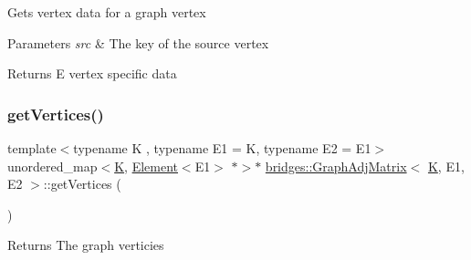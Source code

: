 \begin{DoxyVerb}Gets vertex data for a graph vertex
\end{DoxyVerb}



\begin{DoxyParams}{Parameters}
{\em src} & The key of the source vertex\\
\hline
\end{DoxyParams}
\begin{DoxyReturn}{Returns}
E vertex specific data 
\end{DoxyReturn}
\mbox{\label{classbridges_1_1_graph_adj_matrix_a83f79301ef6807c2a40f288c808f758b}} 
\subsubsection{\texorpdfstring{getVertices()}{getVertices()}}
{\footnotesize\ttfamily template$<$typename K , typename E1  = K, typename E2  = E1$>$ \\
unordered\+\_\+map$<$\mbox{\hyperlink{namespacebridges_acfb0a4f7877d8f63de3e6862004c50edaa5f3c6a11b03839d46af9fb43c97c188}{K}}, \mbox{\hyperlink{classbridges_1_1_element}{Element}}$<$E1$>$ $\ast$$>$$\ast$ \mbox{\hyperlink{classbridges_1_1_graph_adj_matrix}{bridges\+::\+Graph\+Adj\+Matrix}}$<$ \mbox{\hyperlink{namespacebridges_acfb0a4f7877d8f63de3e6862004c50edaa5f3c6a11b03839d46af9fb43c97c188}{K}}, E1, E2 $>$\+::get\+Vertices (\begin{DoxyParamCaption}{ }\end{DoxyParamCaption})\hspace{0.3cm}{\ttfamily [inline]}}

\begin{DoxyReturn}{Returns}
The graph verticies 
\end{DoxyReturn}
\mbox{\label{classbridges_1_1_graph_adj_matrix_a895b044adb939413fc695c15415b848b}} 
